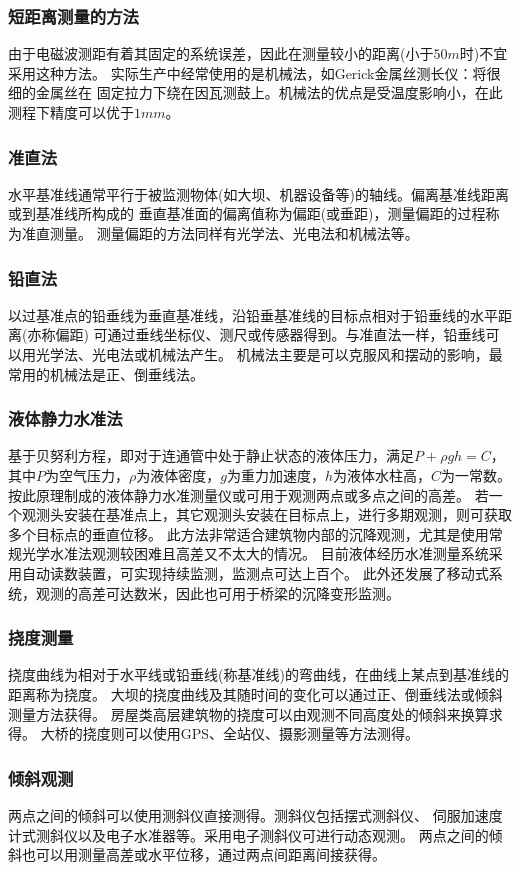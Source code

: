 \subsubsection*{短距离测量的方法}
由于电磁波测距有着其固定的系统误差，因此在测量较小的距离(小于$50m$时)不宜采用这种方法。
实际生产中经常使用的是机械法，如Gerick金属丝测长仪：将很细的金属丝在
固定拉力下绕在因瓦测鼓上。机械法的优点是受温度影响小，在此测程下精度可以优于$1mm$。
\subsubsection*{准直法}
水平基准线通常平行于被监测物体(如大坝、机器设备等)的轴线。偏离基准线距离或到基准线所构成的
垂直基准面的偏离值称为偏距(或垂距)，测量偏距的过程称为准直测量。
测量偏距的方法同样有光学法、光电法和机械法等。
\subsubsection*{铅直法}
以过基准点的铅垂线为垂直基准线，沿铅垂基准线的目标点相对于铅垂线的水平距离(亦称偏距)
可通过垂线坐标仪、测尺或传感器得到。与准直法一样，铅垂线可以用光学法、光电法或机械法产生。
机械法主要是可以克服风和摆动的影响，最常用的机械法是正、倒垂线法。
\subsubsection*{液体静力水准法}
基于贝努利方程，即对于连通管中处于静止状态的液体压力，满足$P+{\rho}gh=C$，
其中$P$为空气压力，$\rho$为液体密度，$g$为重力加速度，$h$为液体水柱高，$C$为一常数。
按此原理制成的液体静力水准测量仪或可用于观测两点或多点之间的高差。
若一个观测头安装在基准点上，其它观测头安装在目标点上，进行多期观测，则可获取多个目标点的垂直位移。
此方法非常适合建筑物内部的沉降观测，尤其是使用常规光学水准法观测较困难且高差又不太大的情况。
目前液体经历水准测量系统采用自动读数装置，可实现持续监测，监测点可达上百个。
此外还发展了移动式系统，观测的高差可达数米，因此也可用于桥梁的沉降变形监测。
\subsubsection*{挠度测量}
挠度曲线为相对于水平线或铅垂线(称基准线)的弯曲线，在曲线上某点到基准线的距离称为挠度。
大坝的挠度曲线及其随时间的变化可以通过正、倒垂线法或倾斜测量方法获得。
房屋类高层建筑物的挠度可以由观测不同高度处的倾斜来换算求得。
大桥的挠度则可以使用GPS、全站仪、摄影测量等方法测得。
\subsubsection*{倾斜观测}
两点之间的倾斜可以使用测斜仪直接测得。测斜仪包括摆式测斜仪、
伺服加速度计式测斜仪以及电子水准器等。采用电子测斜仪可进行动态观测。
两点之间的倾斜也可以用测量高差或水平位移，通过两点间距离间接获得。
